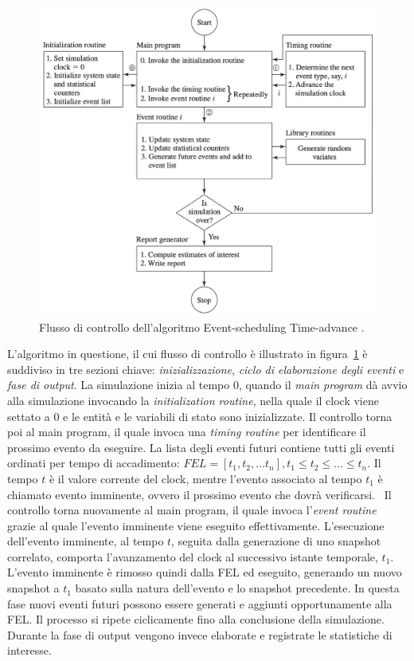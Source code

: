 \documentclass[12pt,a4paper,openright,twoside]{book}
\begin{document}
\begin{figure}
    \centering
    \includegraphics[width=.7\linewidth]{figures/discrete-event-simulation/time-advance-flow.png}
    \caption{Flusso di controllo dell'algoritmo Event-scheduling Time-advance \cite{Law15}.}
    \label{fig:next-event-flow}
\end{figure}

L'algoritmo in questione, il cui flusso di controllo è illustrato in figura~\ref{fig:next-event-flow} è suddiviso in tre sezioni chiave: \textit{inizializzazione}, \textit{ciclo di elaborazione degli eventi} e \textit{fase di output}.
La simulazione inizia al tempo 0, quando il \textit{main program} dà avvio alla simulazione invocando la \textit{initialization routine}, nella quale il clock viene settato a 0 e le entità e le variabili di stato sono inizializzate.
Il controllo torna poi al main program, il quale invoca una \textit{timing routine} per identificare il prossimo evento da eseguire.
La lista degli eventi futuri contiene tutti gli eventi ordinati per tempo di accadimento: $FEL = [t_1, t_2, \dots t_n], t_1 \leq t_2 \leq \dots \leq t_n$. 
Il tempo $t$ è il valore corrente del clock, mentre l'evento associato al tempo $t_1$ è chiamato evento imminente, ovvero il prossimo evento che dovrà verificarsi.~\cite{DBLP:books/daglib/0034857}
Il controllo torna nuovamente al main program, il quale invoca l'\textit{event routine} grazie al quale l'evento imminente viene eseguito effettivamente. 
L'esecuzione dell'evento imminente, al tempo $t$, seguita dalla generazione di uno snapshot correlato, comporta l'avanzamento del clock al successivo istante temporale, $t_1$. L'evento imminente è rimosso quindi dalla FEL ed eseguito, generando un nuovo snapshot a $t_1$ basato sulla natura dell'evento e lo snapshot precedente. In questa fase nuovi eventi futuri possono essere generati e aggiunti opportunamente alla FEL.
Il processo si ripete ciclicamente fino alla conclusione della simulazione. 
Durante la fase di output vengono invece elaborate e registrate le statistiche di interesse. 
\end{document}
